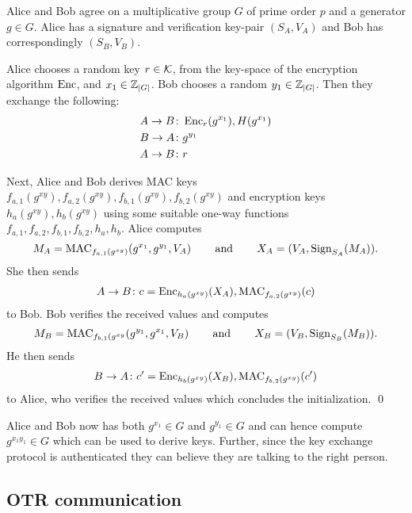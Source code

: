 \begin{protocol}\label{proto:otrinit}
  Alice and Bob agree on a multiplicative group \(G\) of prime order \(p\) and 
  a generator \(g\in G\).
  Alice has a signature and verification key-pair \((S_A, V_A)\) and Bob has 
  correspondingly \((S_B, V_B)\).

  Alice chooses a random key \(r\in \operatorname{\mathcal K}\), from the key-space of the encryption 
  algorithm \(\operatorname{\mathrm{Enc}}\), and \(x_1\in \operatorname{\mathbb Z}_{|G|}\).
  Bob chooses a random \(y_1\in \operatorname{\mathbb Z}_{|G|}\).
  Then they exchange the following:
  \begin{align*}
    A\to B &\colon \operatorname{\mathrm{Enc}}_r( g^{x_1} ), H( g^{x_1} ) \\
    B\to A &\colon g^{y_1} \\
    A\to B &\colon r
  \end{align*}

  Next, Alice and Bob derives \ac{MAC} keys \(f_{a,1}( g^{xy} ), f_{a,2}( 
  g^{xy} ), f_{b,1}( g^{xy} ), f_{b,2}( g^{xy} )\) and encryption keys \(h_a( 
  g^{xy} ), h_b( g^{xy} )\) using some suitable one-way functions \(f_{a,1}, 
  f_{a,2}, f_{b,1}, f_{b,2}, h_a, h_b\).
  Alice computes \[M_A = \operatorname{\mathrm{MAC}}_{f_{a,1}(g^{xy})}( g^{x_1}, g^{y_1}, V_A 
  )\operatorname{\qquad and\qquad} X_A = ( V_A, \operatorname{\mathrm{Sign}}_{S_A}( M_A ) ).\]
  She then sends
  \begin{align*}
    A\to B\colon c = \operatorname{\mathrm{Enc}}_{h_a(g^{xy})}( X_A ), \operatorname{\mathrm{MAC}}_{f_{a,2}(g^{xy})}( c )
  \end{align*}
  to Bob.
  Bob verifies the received values and computes \[M_B = \operatorname{\mathrm{MAC}}_{f_{b,1}(g^{xy}}( 
  g^{y_1}, g^{x_1}, V_B )\operatorname{\qquad and\qquad} X_B = ( V_B, \operatorname{\mathrm{Sign}}_{S_B}( M_B ) ).\]
  He then sends
  \begin{align*}
    B\to A\colon c^\prime = \operatorname{\mathrm{Enc}}_{h_b(g^{xy})}( X_B ), \operatorname{\mathrm{MAC}}_{f_{b,2}(g^{xy})}( 
    c^\prime )
  \end{align*}
  to Alice, who verifies the received values which concludes the 
  initialization.
  \qed
\end{protocol}

Alice and Bob now has both \(g^{x_1}\in G\) and \(g^{y_1}\in G\) and can hence 
compute \(g^{x_1 y_1}\in G\) which can be used to derive keys.
Further, since the key exchange protocol is authenticated they can believe they 
are talking to the right person.

\subsection{\acs{OTR} communication}

